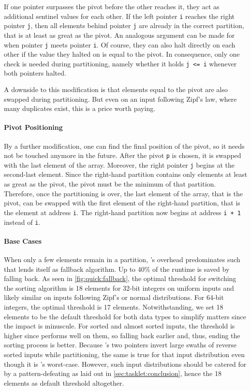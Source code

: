 If one pointer surpasses the pivot before the other reaches it, they act as additional sentinel values for each other.
If the left pointer \lstinline|i| reaches the right pointer \lstinline|j|, then all elements behind pointer \lstinline|j| are already in the correct partition, that is at least as great as the pivot.
An analogous argument can be made for when pointer \lstinline|j| meets pointer \lstinline|i|.
Of course, they can also halt directly on each other if the value they halted on is equal to the pivot.
In consequence, only one check is needed during partitioning, namely whether it holds \lstinline|j <= i| whenever both pointers halted.

A downside to this modification is that elements equal to the pivot are also swapped during partitioning.
But even on an input following Zipf's law, where many duplicates exist, this is a price worth paying.


\paragraph{Pivot Positioning}
By a further modification, one can find the final position of the pivot, so it needs not be touched anymore in the future.
After the pivot \lstinline|p| is chosen, it is swapped with the last element of the array.
Moreover, the right pointer \lstinline|j| begins at the second-last element.
Since the right-hand partition contains only elements at least as great as the pivot, the pivot must be the minimum of that partition.
Therefore, once the partitioning is over, the last element of the array, that is the pivot, can be swapped with the first element of the right-hand partition, that is the element at address \lstinline|i|.
The right-hand partition now begins at address \lstinline|i + 1| instead of \lstinline|i|.


\paragraph{Base Cases}
When only a few elements remain in a partition, \QS{}'s overhead predominates such that \IS{} lends itself as fallback algorithm.
Up to 40\% of the runtime is saved by falling back.
As seen in \cref{fig:quick:fallback}, the optimal threshold for switching the sorting algorithm is 18 elements for 32-bit integers on uniform inputs and likely similar on inputs following Zipf's or normal distributions.
For 64-bit integers, the optimal threshold is 17 elements.
Notwithstanding, we set 18 elements to be the default threshold for both data types to simplify matters since the impact is minuscule.
For sorted and almost sorted inputs, the threshold is higher since \IS{} performs well on them, so falling back earlier and, thus, ending the sorting process is better.
Because \QS{}'s two pointers invert large swaths of reverse sorted inputs while partitioning, the same is true for that input distribution even though it is \IS{}'s worst-case.
However, such input distributions should be catered for by a pattern-defeating \QS{} as laid out in \cref{sec:tasklet:conclusion}, hence the 18 elements as default threshold altogether.

